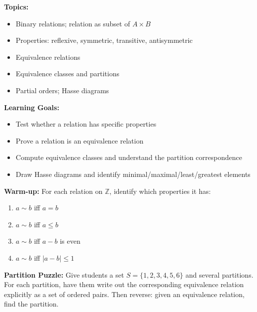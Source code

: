 \documentclass[11pt]{article}
\begin{document}
\begin{classabox}
\textbf{Topics:}
\begin{itemize}
    \item Binary relations; relation as subset of $A \times B$
    \item Properties: reflexive, symmetric, transitive, antisymmetric
    \item Equivalence relations
    \item Equivalence classes and partitions
    \item Partial orders; Hasse diagrams
\end{itemize}

\textbf{Learning Goals:}
\begin{itemize}
    \item Test whether a relation has specific properties
    \item Prove a relation is an equivalence relation
    \item Compute equivalence classes and understand the partition correspondence
    \item Draw Hasse diagrams and identify minimal/maximal/least/greatest elements
\end{itemize}

\textbf{Warm-up:} For each relation on $\mathbb{Z}$, identify which properties it has:
\begin{enumerate}
    \item $a \sim b$ iff $a = b$
    \item $a \sim b$ iff $a \leq b$
    \item $a \sim b$ iff $a - b$ is even
    \item $a \sim b$ iff $|a - b| \leq 1$
\end{enumerate}
\end{classabox}

\begin{activitybox}
\textbf{Partition Puzzle:} Give students a set $S = \{1, 2, 3, 4, 5, 6\}$ and several partitions. For each partition, have them write out the corresponding equivalence relation explicitly as a set of ordered pairs. Then reverse: given an equivalence relation, find the partition.
\end{activitybox}
\end{document}
